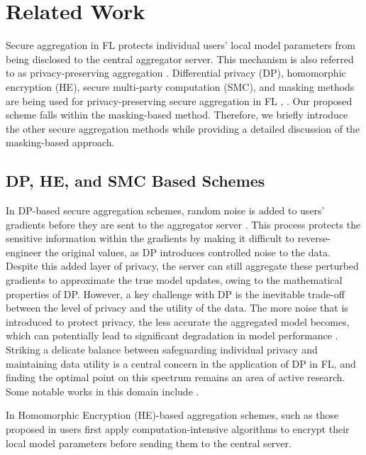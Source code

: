 \section{Related Work}
\label{sec:related-work}
Secure aggregation in FL protects individual users' local model parameters from being disclosed to the central aggregator server. This mechanism is also referred to as privacy-preserving aggregation \cite{Liu2022}. Differential privacy (DP), homomorphic encryption (HE), secure multi-party computation (SMC), and masking methods are being used for privacy-preserving secure aggregation in FL \cite{Yin2021}, \cite{Liu2022}. Our proposed scheme falls within the masking-based method. Therefore, we briefly introduce the other secure aggregation methods while providing a detailed discussion of the masking-based approach.  
\subsection{DP, HE, and SMC Based Schemes}
In DP-based secure aggregation schemes, random noise is added to users' gradients before they are sent to the aggregator server \cite{Wei2020}. This process protects the sensitive information within the gradients by making it difficult to reverse-engineer the original values, as DP introduces controlled noise to the data. Despite this added layer of privacy, the server can still aggregate these perturbed gradients to approximate the true model updates, owing to the mathematical properties of DP. However, a key challenge with DP is the inevitable trade-off between the level of privacy and the utility of the data. The more noise that is introduced to protect privacy, the less accurate the aggregated model becomes, which can potentially lead to significant degradation in model performance \cite{Liu2023}. 
Striking a delicate balance between safeguarding individual privacy and maintaining data utility is a central concern in the application of DP in FL, and finding the optimal point on this spectrum remains an area of active research. Some notable works in this domain include \cite{Wei2020, Wang2020, Zhou2022}.
\par 
In Homomorphic Encryption (HE)-based aggregation schemes, such as those proposed in \cite{Chan2012, Phong2018, Ma2022, Sav2021, Zhang2020Usenix} users first apply computation-intensive algorithms to encrypt their local model parameters before sending them to the central server.
